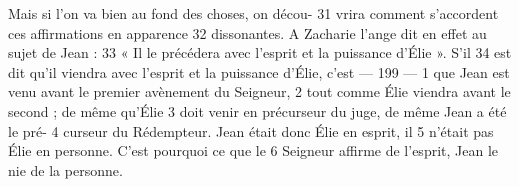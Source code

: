 Mais si l'on va bien au fond des choses, on décou-	 
31	 	vrira comment s'accordent ces affirmations en apparence	 
32	 	dissonantes. A Zacharie l'ange dit en effet au sujet de Jean :	 
33	 	« Il le précédera avec l'esprit et la puissance d'Élie ». S'il	 
34	 	est dit qu'il viendra avec l'esprit et la puissance d'Élie, c'est	 
 	--- 199 ---	 
1	 	que Jean est venu avant le premier avènement du Seigneur,	 
2	 	tout comme Élie viendra avant le second ; de même qu'Élie	 
3	 	doit venir en précurseur du juge, de même Jean a été le pré-	 
4	 	curseur du Rédempteur. Jean était donc Élie en esprit, il	 
5	 	n'était pas Élie en personne. C'est pourquoi ce que le	 
6	 	Seigneur affirme de l'esprit, Jean le nie de la personne.